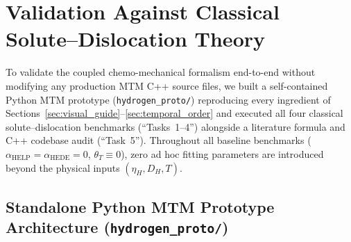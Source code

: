 \documentclass[11pt,a4paper]{article}
\newcommand{\code}[1]{\texttt{#1}}
\begin{document}
\section{Validation Against Classical Solute--Dislocation Theory}
\label{sec:validation}

To validate the coupled chemo-mechanical formalism end-to-end without modifying any production MTM C++ source files, we built a self-contained Python MTM prototype (\code{hydrogen\_proto/}) reproducing every ingredient of Sections~\ref{sec:visual_guide}--\ref{sec:temporal_order} and executed all four classical solute--dislocation benchmarks (``Tasks~1--4'') alongside a literature formula and C++ codebase audit (``Task~5''). Throughout all baseline benchmarks ($\alpha_{\text{HELP}} = \alpha_{\text{HEDE}} = 0$, $\theta_T \equiv 0$), zero ad hoc fitting parameters are introduced beyond the physical inputs $(\eta_H, D_H, T)$.

\subsection{Standalone Python MTM Prototype Architecture (\code{hydrogen\_proto/})}
\label{subsec:proto_arch}
\end{document}

